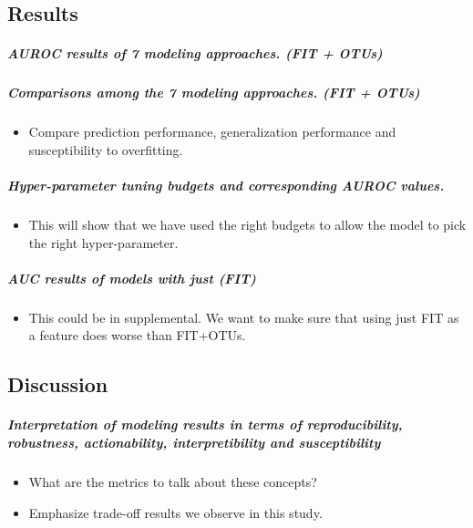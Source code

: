 \documentclass[11pt,]{article}
\providecommand{\tightlist}{%
  \setlength{\itemsep}{0pt}\setlength{\parskip}{0pt}}
\let\oldsubparagraph\subparagraph
\renewcommand{\subparagraph}[1]{\oldsubparagraph{#1}\mbox{}}
\begin{document}
\subsection{Results}\label{results}

\subparagraph{AUROC results of 7 modeling approaches. (FIT +
OTUs)}\label{auroc-results-of-7-modeling-approaches.-fit-otus}

\subparagraph{Comparisons among the 7 modeling approaches. (FIT +
OTUs)}\label{comparisons-among-the-7-modeling-approaches.-fit-otus}

\begin{itemize}
\tightlist
\item
  Compare prediction performance, generalization performance and
  susceptibility to overfitting.
\end{itemize}

\subparagraph{Hyper-parameter tuning budgets and corresponding AUROC
values.}\label{hyper-parameter-tuning-budgets-and-corresponding-auroc-values.}

\begin{itemize}
\tightlist
\item
  This will show that we have used the right budgets to allow the model
  to pick the right hyper-parameter.
\end{itemize}

\subparagraph{AUC results of models with just
(FIT)}\label{auc-results-of-models-with-just-fit}

\begin{itemize}
\tightlist
\item
  This could be in supplemental. We want to make sure that using just
  FIT as a feature does worse than FIT+OTUs.
\end{itemize}

\subsection{Discussion}\label{discussion}

\subparagraph{Interpretation of modeling results in terms of
reproducibility, robustness, actionability, interpretibility and
susceptibility}\label{interpretation-of-modeling-results-in-terms-of-reproducibility-robustness-actionability-interpretibility-and-susceptibility}

\begin{itemize}
\item
  What are the metrics to talk about these concepts?
\item
  Emphasize trade-off results we observe in this study.
\end{itemize}
\end{document}

